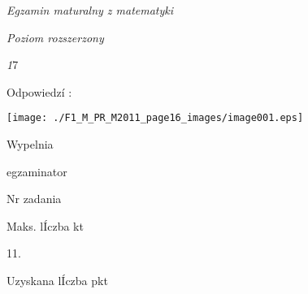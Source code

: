 \documentclass[a4paper,12pt]{article}
\begin{document}
{\it Egzamin maturalny z matematyki}

{\it Poziom rozszerzony}

{\it 1}7

Odpowiedzí :
\begin{center}
\texttt{[image: ./F1\_M\_PR\_M2011\_page16\_images/image001.eps]}
\end{center}
Wypelnia

egzaminator

Nr zadania

Maks. lÍczba kt

11.

Uzyskana lÍczba pkt
\end{document}

